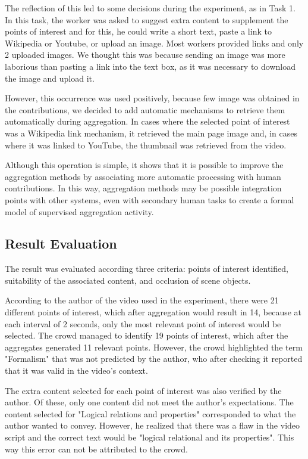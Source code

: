 The reflection of this led to some decisions during the experiment, as in Task 1. In this task, the worker was asked to suggest extra content to supplement the points of interest and for this, he could write a short text, paste a link to Wikipedia or Youtube, or upload an image. Most workers provided links and only 2 uploaded images. We thought this was because sending an image was more laborious than pasting a link into the text box, as it was necessary to download the image and upload it.

\pagebreak

However, this occurrence was used positively, because few image was obtained in the contributions, we decided to add automatic mechanisms to retrieve them automatically during aggregation. In cases where the selected point of interest was a Wikipedia link mechanism, it retrieved the main page image and, in cases where it was linked to YouTube, the thumbnail was retrieved from the video.

Although this operation is simple, it shows that it is possible to improve the aggregation methods by associating more automatic processing with human contributions. In this way, aggregation methods may be possible integration points with other systems, even with secondary human tasks to create a formal model of supervised aggregation activity.

\subsection{Result Evaluation}
The result was evaluated according three criteria: points of interest identified, suitability of the associated content, and occlusion of scene objects.

According to the author of the video used in the experiment, there were 21 different points of interest, which after aggregation would result in 14, because at each interval of 2 seconds, only the most relevant point of interest would be selected. The crowd managed to identify 19 points of interest, which after the aggregates generated 11 relevant points. However, the crowd highlighted the term "Formalism" that  was not predicted by the author, who after checking it reported that it was valid in the video's context.

The extra content selected for each point of interest was also verified by the author. Of these, only one content did not meet the author's expectations. The content selected for "Logical relations and properties" corresponded to what the author wanted to convey. However, he realized that there was a flaw in the video script and the correct text would be "logical relational and its properties". This way this error can not be attributed to the crowd.

